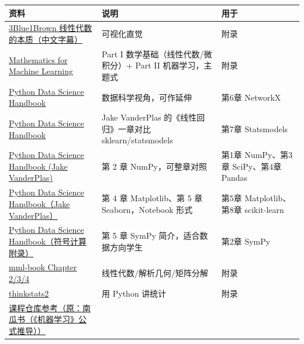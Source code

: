 {\def\LTcaptype{none} %
\begin{longtable}[]{@{}
  >{\raggedright\arraybackslash}p{}
  >{\raggedright\arraybackslash}p{}
  >{\raggedright\arraybackslash}p{}@{}}
\toprule\noalign{}
\begin{minipage}[b]{\linewidth}\raggedright
资料
\end{minipage} & \begin{minipage}[b]{\linewidth}\raggedright
说明
\end{minipage} & \begin{minipage}[b]{\linewidth}\raggedright
用于
\end{minipage} \\
\midrule\noalign{}
\endhead
\bottomrule\noalign{}
\endlastfoot
\href{https://space.bilibili.com/88461692/}{3Blue1Brown
线性代数的本质（中文字幕）} & 可视化直觉 & 附录 \\
\href{https://mml-book.github.io/}{Mathematics for Machine Learning} &
Part I 数学基础（线性代数/微积分）+ Part II 机器学习，主题式 & 附录 \\
\href{https://github.com/jakevdp/PythonDataScienceHandbook}{Python Data
Science Handbook} & 数据科学视角，可作延伸 & 第6章 NetworkX \\
\href{https://jakevdp.github.io/PythonDataScienceHandbook/}{Python Data
Science Handbook} & Jake VanderPlas 的《线性回归》一章对比
sklearn/statsmodels & 第7章 Statsmodels \\
\href{https://github.com/jakevdp/PythonDataScienceHandbook}{Python Data
Science Handbook (Jake VanderPlas)} & 第 2 章 NumPy，可整章对照 & 第1章
NumPy、第3章 SciPy、第4章 Pandas \\
\href{https://github.com/jakevdp/PythonDataScienceHandbook}{Python Data
Science Handbook（Jake VanderPlas）} & 第 4 章 Matplotlib、第 5 章
Seaborn，Notebook 形式 & 第5章 Matplotlib、第8章 scikit-learn \\
\href{https://github.com/jakevdp/PythonDataScienceHandbook}{Python Data
Science Handbook（符号计算附录）} & 第 5 章 SymPy 简介，适合数据方向学生
& 第2章 SymPy \\
\href{https://mml-book.github.io/}{mml-book Chapter 2/3/4} &
线性代数/解析几何/矩阵分解 & 附录 \\
\href{https://github.com/AllenDowney/ThinkStats2}{thinkstats2} & 用
Python 讲统计 & 附录 \\
\href{https://github.com/huahbo/python_computing}{课程仓库参考（原：南瓜书（《机器学习》公式推导））}

\end{longtable}}
